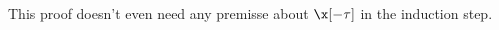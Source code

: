             This proof doesn't even need any premisse about $\x[-\tau]$ in the induction step.







